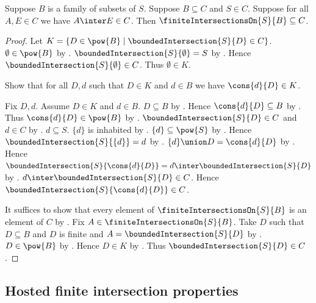 \begin{theorem}\label{finite_intersections_on_least}
    Suppose $B$ is a family of subsets of $S$.
    Suppose $B\subseteq C$ and $S\in C$.
    Suppose for all $A,E\in C$ we have $A\inter E\in C$.
    Then $\finiteIntersectionsOn{S}{B}\subseteq C$.
\end{theorem}
\begin{proof}
    Let $K=\{D\in\pow{B}\mid
        \boundedIntersection{S}{D}\in C\}$.
    $\emptyset\in\pow{B}$ by .
    $\boundedIntersection{S}{\emptyset}=S$ by
        .
    Hence $\boundedIntersection{S}{\emptyset}\in C$.
    Thus $\emptyset\in K$.

    Show that for all $D,d$ such that $D\in K$ and $d\in B$ we have
        $\cons{d}{D}\in K$.
    \begin{subproof}
        Fix $D,d$.
        Assume $D\in K$ and $d\in B$.
        $D\subseteq B$ by .
        Hence $\cons{d}{D}\subseteq B$ by
            .
        Thus $\cons{d}{D}\in\pow{B}$ by
            .
        $\boundedIntersection{S}{D}\in C$ and $d\in C$
            by .
        $d\subseteq S$.
        $\{d\}$ is inhabited by .
        $\{d\}\subseteq\pow{S}$ by
            .
        Hence $\boundedIntersection{S}{\{d\}}=d$ by
            .
        $\{d\}\union D=\cons{d}{D}$ by
            .
        Hence $\boundedIntersection{S}{\cons{d}{D}}
            =d\inter\boundedIntersection{S}{D}$ by
            .
        $d\inter\boundedIntersection{S}{D}\in C$.
        Hence $\boundedIntersection{S}{\cons{d}{D}}\in C$.
    \end{subproof}

    It suffices to show that every element of
        $\finiteIntersectionsOn{S}{B}$ is an element of $C$
        by .
    Fix $A\in\finiteIntersectionsOn{S}{B}$.
    Take $D$ such that $D\subseteq B$ and $D$ is finite and
        $A=\boundedIntersection{S}{D}$
        by .
    $D\in\pow{B}$ by .
    Hence $D\in K$ by .
    Thus $\boundedIntersection{S}{D}\in C$.
\end{proof}

\subsection{Hosted finite intersection properties}

